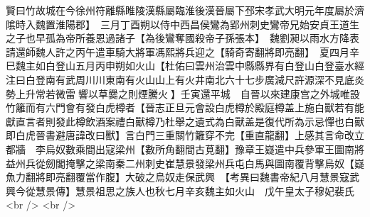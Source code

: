 賢曰竹故城在今徐州符離縣睢陵漢縣屬臨淮後漢晉屬下邳宋孝武大明元年度屬於濟隂時入魏置淮陽郡】　三月丁酉朔以侍中西昌侯鸞為郢州刺史鸞帝兄始安貞王道生之子也早孤為帝所養恩過諸子【為後鸞奪國殺帝子孫張本】　魏劉昶以雨水方降表請還師魏人許之丙午遣車騎大將軍馮熙將兵迎之【騎奇寄翻將即亮翻】　夏四月辛巳魏主如白登山五月丙申朔如火山【杜佑曰雲州治雲中縣縣界有白登山白登臺水經注曰白登南有武周川川東南有火山山上有火井南北六十七步廣減尺許源深不見底炎勢上升常若微雷響以草爨之則煙騰火】壬寅還平城　自晉以來建康宫之外城唯設竹籬而有六門會有發白虎樽者【晉志正旦元會設白虎樽於殿庭樽盖上施白獸若有能獻直言者則發此樽飲酒案禮白獸樽乃杜舉之遺式為白獸盖是復代所為示忌憚也白獸即白虎晉書避唐諱改曰獸】言白門三重關竹籬穿不完【重直龍翻】上感其言命改立都牆　李烏奴數乘間出寇梁州【數所角翻間古莧翻】豫章王嶷遣中兵參軍王圖南將益州兵從劒閣掩擊之梁南秦二州刺史崔慧景發梁州兵屯白馬與圖南覆背擊烏奴【嶷魚力翻將即亮翻覆當作腹】大破之烏奴走保武興　【考異曰魏書帝紀八月慧景寇武興今從慧景傳】慧景祖思之族人也秋七月辛亥魏主如火山　戊午皇太子穆妃裴氏<br />
<br />
